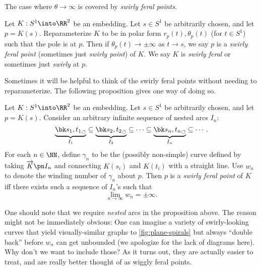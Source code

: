 The case where $\theta \to \infty$ is covered by \emph{swirly feral
  points}.
\begin{definition}\label{def:swirly-feral}
  Let $K : S^1\into \RR^2$ be an embedding. Let $s \in S^1$ be
  arbitrarily chosen, and let $p = K(s)$. Reparameterize $K$ to be in
  polar form $r_p(t), \theta_p(t)$ (for $t \in S^1$) such that the
  pole is at $p$. Then if $\theta_p(t) \to \pm \infty$ as $t \to s$,
  we say $p$ is a \emph{swirly feral point} (sometimes just
  \emph{swirly point}) of $K$. We say $K$ is \emph{swirly feral} or
  sometimes just \emph{swirly} at $p$.
\end{definition}
Sometimes it will be helpful to think of the swirly feral points
without needing to reparameterize. The following proposition gives one
way of doing so.
\begin{proposition}\label{prop:swirly-ferality-and-winding-number}
  Let $K : S^1 \into \RR^2$ be an embedding. Let $s \in S^1$ be
  arbitrarily chosen, and let $p = K(s)$. Consider an arbitrary
  infinite sequence of nested arcs $I_n$:
  \[
    \underbrace{\sbk{s_1, t_1}}_{I_1} \subseteq \underbrace{\sbk{s_2,
        t_2}}_{I_2} \subseteq \cdots \subseteq \underbrace{\sbk{s_n,
        t_n}}_{I_n} \subseteq \cdots.
  \]
  For each $n \in \NN$, define $\gamma_n$ to be the (possibly
  non-simple) curve defined by taking $\fim{K}{I_n}$ and connecting
  $K(s_i)$ and $K(t_i)$ with a straight line. Use $w_n$ to denote the
  winding number of $\gamma_n$ about $p$. Then $p$ is a \emph{swirly
    feral point} of $K$ iff there exists such a sequence of $I_n$'s
  such that
  \[
    \lim_{n \to \infty} w_n = \pm \infty.
  \]
\end{proposition}
\begin{remark}
  One should note that we require \emph{nested} arcs in the
  proposition above. The reason might not be immediately obvious: One
  can imagine a variety of swirly-looking curves that yield
  visually-similar graphs to \cref{fig:plane-spirals} but always
  ``double back'' before $w_n$ can get unbounded (we apologize for the
  lack of diagrams here). Why don't we want to include those? As it
  turns out, they are actually easier to treat, and are really better
  thought of as wiggly feral points.
\end{remark}
